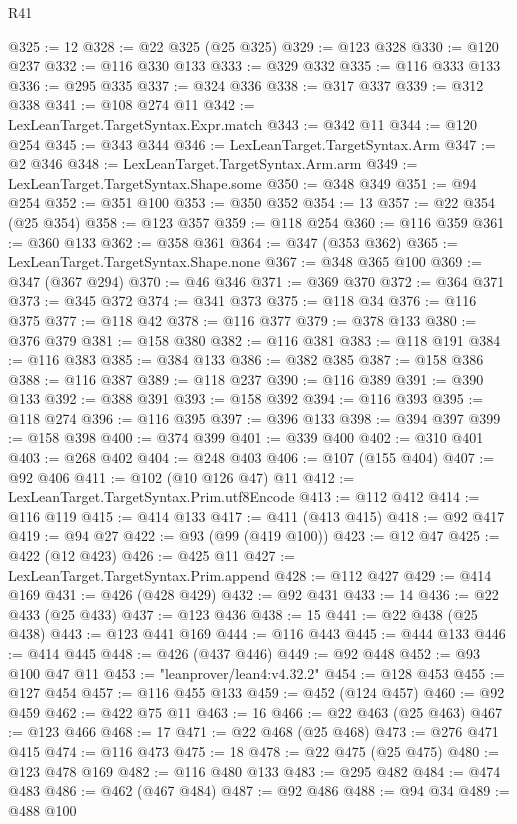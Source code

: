 \begin{lexlean}{R41}
\begin{coremodule}
@325 := 12
@328 := @22 @325 (@25 @325)
@329 := @123 @328
@330 := @120 @237
@332 := @116 @330 @133
@333 := @329 @332
@335 := @116 @333 @133
@336 := @295 @335
@337 := @324 @336
@338 := @317 @337
@339 := @312 @338
@341 := @108 @274 @11
@342 := LexLeanTarget.TargetSyntax.Expr.match
@343 := @342 @11
@344 := @120 @254
@345 := @343 @344
@346 := LexLeanTarget.TargetSyntax.Arm
@347 := @2 @346
@348 := LexLeanTarget.TargetSyntax.Arm.arm
@349 := LexLeanTarget.TargetSyntax.Shape.some
@350 := @348 @349
@351 := @94 @254
@352 := @351 @100
@353 := @350 @352
@354 := 13
@357 := @22 @354 (@25 @354)
@358 := @123 @357
@359 := @118 @254
@360 := @116 @359
@361 := @360 @133
@362 := @358 @361
@364 := @347 (@353 @362)
@365 := LexLeanTarget.TargetSyntax.Shape.none
@367 := @348 @365 @100
@369 := @347 (@367 @294)
@370 := @46 @346
@371 := @369 @370
@372 := @364 @371
@373 := @345 @372
@374 := @341 @373
@375 := @118 @34
@376 := @116 @375
@377 := @118 @42
@378 := @116 @377
@379 := @378 @133
@380 := @376 @379
@381 := @158 @380
@382 := @116 @381
@383 := @118 @191
@384 := @116 @383
@385 := @384 @133
@386 := @382 @385
@387 := @158 @386
@388 := @116 @387
@389 := @118 @237
@390 := @116 @389
@391 := @390 @133
@392 := @388 @391
@393 := @158 @392
@394 := @116 @393
@395 := @118 @274
@396 := @116 @395
@397 := @396 @133
@398 := @394 @397
@399 := @158 @398
@400 := @374 @399
@401 := @339 @400
@402 := @310 @401
@403 := @268 @402
@404 := @248 @403
@406 := @107 (@155 @404)
@407 := @92 @406
@411 := @102 (@10 @126 @47) @11
@412 := LexLeanTarget.TargetSyntax.Prim.utf8Encode
@413 := @112 @412
@414 := @116 @119
@415 := @414 @133
@417 := @411 (@413 @415)
@418 := @92 @417
@419 := @94 @27
@422 := @93 (@99 (@419 @100))
@423 := @12 @47
@425 := @422 (@12 @423)
@426 := @425 @11
@427 := LexLeanTarget.TargetSyntax.Prim.append
@428 := @112 @427
@429 := @414 @169
@431 := @426 (@428 @429)
@432 := @92 @431
@433 := 14
@436 := @22 @433 (@25 @433)
@437 := @123 @436
@438 := 15
@441 := @22 @438 (@25 @438)
@443 := @123 @441 @169
@444 := @116 @443
@445 := @444 @133
@446 := @414 @445
@448 := @426 (@437 @446)
@449 := @92 @448
@452 := @93 @100 @47 @11
@453 := "leanprover/lean4:v4.32.2"
@454 := @128 @453
@455 := @127 @454
@457 := @116 @455 @133
@459 := @452 (@124 @457)
@460 := @92 @459
@462 := @422 @75 @11
@463 := 16
@466 := @22 @463 (@25 @463)
@467 := @123 @466
@468 := 17
@471 := @22 @468 (@25 @468)
@473 := @276 @471 @415
@474 := @116 @473
@475 := 18
@478 := @22 @475 (@25 @475)
@480 := @123 @478 @169
@482 := @116 @480 @133
@483 := @295 @482
@484 := @474 @483
@486 := @462 (@467 @484)
@487 := @92 @486
@488 := @94 @34
@489 := @488 @100

\end{coremodule}
\end{lexlean}
